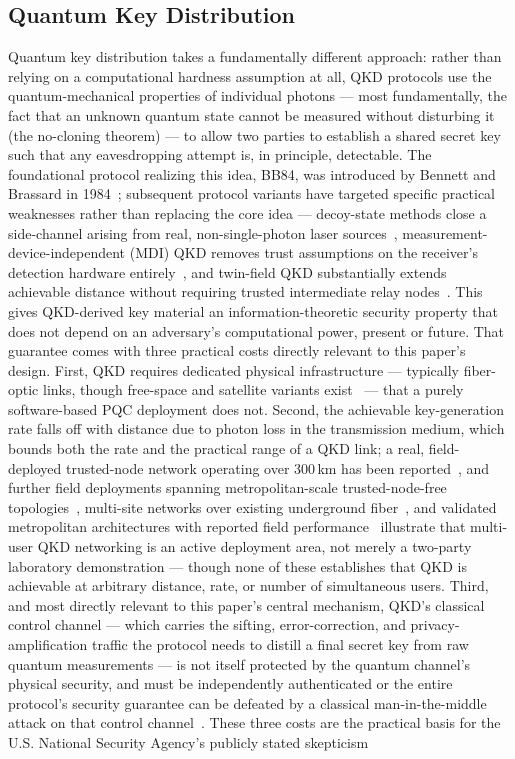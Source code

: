 \documentclass[journal]{IEEEtran}
\begin{document}
\subsection{Quantum Key Distribution}

Quantum key distribution takes a fundamentally different approach: rather than relying on a computational hardness assumption at all, QKD protocols use the quantum-mechanical properties of individual photons --- most fundamentally, the fact that an unknown quantum state cannot be measured without disturbing it (the no-cloning theorem) --- to allow two parties to establish a shared secret key such that any eavesdropping attempt is, in principle, detectable. The foundational protocol realizing this idea, BB84, was introduced by Bennett and Brassard in 1984~\cite{bennett1984bb84}; subsequent protocol variants have targeted specific practical weaknesses rather than replacing the core idea --- decoy-state methods close a side-channel arising from real, non-single-photon laser sources~\cite{lo2005decoystate}, measurement-device-independent (MDI) QKD removes trust assumptions on the receiver's detection hardware entirely~\cite{mdi2025asymmetric,mdi2025freqcomb}, and twin-field QKD substantially extends achievable distance without requiring trusted intermediate relay nodes~\cite{tfqkd2024longdist,tfqkd2023nofreqdissem}. This gives QKD-derived key material an information-theoretic security property that does not depend on an adversary's computational power, present or future. That guarantee comes with three practical costs directly relevant to this paper's design. First, QKD requires dedicated physical infrastructure --- typically fiber-optic links, though free-space and satellite variants exist~\cite{qkd2024satellite} --- that a purely software-based PQC deployment does not. Second, the achievable key-generation rate falls off with distance due to photon loss in the transmission medium, which bounds both the rate and the practical range of a QKD link; a real, field-deployed trusted-node network operating over 300\,km has been reported~\cite{clason2026deployed}, and further field deployments spanning metropolitan-scale trusted-node-free topologies~\cite{qkd2020trustednodefree}, multi-site networks over existing underground fiber~\cite{qkd2026multinode}, and validated metropolitan architectures with reported field performance~\cite{qkd2026metrofield} illustrate that multi-user QKD networking is an active deployment area, not merely a two-party laboratory demonstration --- though none of these establishes that QKD is achievable at arbitrary distance, rate, or number of simultaneous users. Third, and most directly relevant to this paper's central mechanism, QKD's classical control channel --- which carries the sifting, error-correction, and privacy-amplification traffic the protocol needs to distill a final secret key from raw quantum measurements --- is not itself protected by the quantum channel's physical security, and must be independently authenticated or the entire protocol's security guarantee can be defeated by a classical man-in-the-middle attack on that control channel~\cite{atutxasanz2025authentication}. These three costs are the practical basis for the U.S. National Security Agency's publicly stated skepticism 
\end{document}
